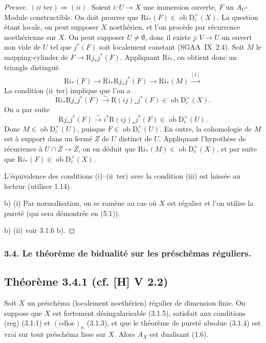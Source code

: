 \documentclass[11pt]{article}
\newcommand{\R}{\mathrm{R}}
\newcommand{\D}{\mathrm{D}}
\newcommand{\ob}{\operatorname{ob}}
\newcommand{\ol}[1]{\overline{#1}}
\providecommand{\ob}{\operatorname{ob}}
\begin{document}
\begin{proof}[Preuve]
$(ii\text{~ter}) \Rightarrow (ii)$. Soient $i : U \to X$ une immersion ouverte, $F$ un $A_U$-Module constructible. On doit prouver que $\R i_{*}(F) \in \ob \D_c^{+}(X)$. La question étant locale, on peut supposer $X$ noethérien, et l'on procède par récurrence noethérienne sur $X$. On peut supposer $U \neq \emptyset$, donc il existe $j : V \to U$ un ouvert non vide de $U$ tel que $j^{*}(F)$ soit localement constant (SGAA~IX~2.4). Soit $M$ le mapping-cylinder de $F \to \R j_{*}j^{*}(F)$. Appliquant $\R i_{*}$, on obtient donc un triangle distingué
\[
\R i_{*}(F) \longrightarrow \R i_{*} \R j_{*} j^{*}(F) \longrightarrow \R i_{*}(M) \xrightarrow{[1]}
\]
La condition (ii~ter) implique que l'on a
\[
\R i_{*} \R j_{*} j^{*}(F) \xrightarrow{\sim} \R(ij)_{*} j^{*}(F) \in \ob \D_c^{+}(X).
\]
On a par suite
\[
\R j_{*}j^{*}(F) \xrightarrow{\sim} i^{*} \R(ij)_{*} j^{*}(F) \in \ob \D_c^{+}(U).
\]
Donc $M \in \ob \D_c^{+}(U)$, puisque $F \in \ob \D_c^{+}(U)$. En outre, la cohomologie de $M$ est à support dans un fermé $Z$ de $U$ distinct de $U$. Appliquant l'hypothèse de récurrence à $U \cap \ol{Z} \to \ol{Z}$, on en déduit que $\R i_{*}(M) \in \ob \D_c^{+}(X)$, et par suite que $\R i_{*}(F) \in \ob \D_c^{+}(X)$.

L'équivalence des conditions (i)--(ii~ter) avec la condition (iii) est laissée au lecteur (utiliser 1.14).

b) (i) Par normalisation, on se ramène au cas où $X$ est régulier et l'on utilise la pureté (qui sera démontrée en (5.1)).

b) (ii) voir 3.1.6 b).
\end{proof}

\subsubsection{3.4. Le théorème de bidualité sur les préschémas réguliers.}

\subsection*{Théorème 3.4.1 (cf. [H] V 2.2)}
Soit $X$ un préschéma (localement noethérien) régulier de dimension finie. On suppose que $X$ est fortement désingularisable (3.1.5), satisfait aux conditions (reg) (3.1.1) et $(\mathrm{cdloc})_n$ (3.1.3), et que le théorème de pureté absolue (3.1.4) est vrai sur tout préschéma lisse sur $X$. Alors $A_X$ est dualisant (1.6).
\end{document}
